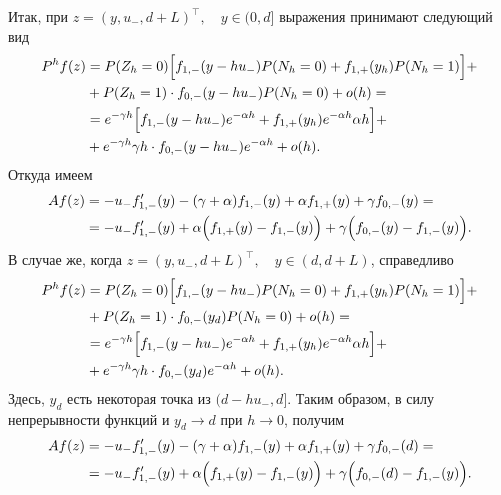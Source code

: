 \documentclass[12pt,a4paper]{article}
\begin{document}
Итак, при $z = \left(y, u_-, d + L\right)^\intercal, \quad y \in (0, d]$ выражения принимают следующий вид
\begin{equation*}
    \begin{aligned} 
  P^h f (z) &= P (Z_h = 0) \Bigl[f_{1, -} (y - h u_-) P (N_h = 0) + f_{1, +} (y_h) P(N_h = 1) \Bigr]  + \\
  & + P (Z_h = 1) \cdot f_{0, -} (y - h u_-) P (N_h = 0) + o (h) =\\
  & = e^{- \gamma h} \Bigl[f_{1,-} (y - h u_-) e^{- \alpha h} + f_{1, +} (y_h) e^{- \alpha h} \alpha h \Bigr] +\\
  & + e^{- \gamma h} \gamma h \cdot f_{0,-} (y - h u_-) e^{- \alpha h} + o(h).
\end{aligned}
\end{equation*}
Откуда имеем
\begin{equation*}
    \begin{aligned}
   A f(z) &= -u_- f_{1,-}' (y) - (\gamma + \alpha) f_{1,-}(y) + \alpha f_{1,+} (y) + \gamma f_{0,-} (y) = \\
   &= -u_- f_{1,-}' (y) + \alpha \Bigl(f_{1,+}(y) - f_{1,-}(y) \Bigr) + \gamma \Bigl(f_{0,-} (y) - f_{1,-} (y) \Bigr).
    \end{aligned}
\end{equation*}
В случае же, когда $z = \left(y, u_-, d + L\right)^\intercal, \quad y \in (d, d + L)$, справедливо
\begin{equation*}
    \begin{aligned} 
  P^h f (z) &= P (Z_h = 0) \Bigl[f_{1, -} (y - h u_-) P (N_h = 0) + f_{1, +} (y_h) P(N_h = 1) \Bigr]  + \\
  & + P (Z_h = 1) \cdot f_{0, -} (y_d) P (N_h = 0) + o (h) =\\
  & = e^{- \gamma h} \Bigl[f_{1,-} (y - h u_-) e^{- \alpha h} + f_{1, +} (y_h) e^{- \alpha h} \alpha h \Bigr] +\\
  & + e^{- \gamma h} \gamma h \cdot f_{0,-} (y_d) e^{- \alpha h} + o(h).
\end{aligned}
\end{equation*}
Здесь, $y_d$ есть некоторая точка из $(d - h u_-, d]$. Таким образом, в силу непрерывности функций и $y_d \to d$ при $h \to 0$, получим
\begin{equation*}
    \begin{aligned}
   A f(z) &= -u_- f_{1,-}' (y) - (\gamma + \alpha) f_{1,-}(y) + \alpha f_{1,+} (y) + \gamma f_{0,-} (d) = \\
   &= -u_- f_{1,-}' (y) + \alpha \Bigl(f_{1,+}(y) - f_{1,-}(y) \Bigr) + \gamma \Bigl(f_{0,-} (d) - f_{1,-} (y) \Bigr).
    \end{aligned}
\end{equation*}
\end{document}
